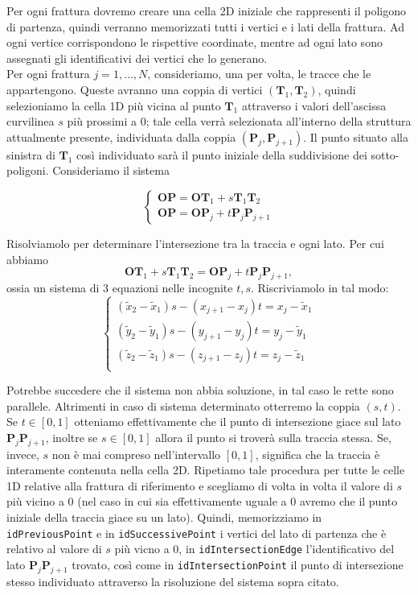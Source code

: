 \documentclass[a4paper]{article}
\newcommand{\B}{\mathbf}
\begin{document}
Per ogni frattura dovremo creare una cella 2D iniziale che rappresenti il poligono di partenza, quindi verranno memorizzati tutti i vertici e i lati della frattura. Ad ogni vertice corrispondono le rispettive coordinate, mentre ad ogni lato sono assegnati gli identificativi dei vertici che lo generano. \\

Per ogni frattura $j=1,\dots,N$, consideriamo, una per volta, le tracce che le appartengono. Queste avranno una coppia di vertici $(\B T_{1},\B T_{2})$, quindi selezioniamo la cella 1D più vicina al punto $\B T_1$ attraverso i valori dell'ascissa curvilinea $s$ più prossimi a $0$; tale cella verrà selezionata all'interno della struttura attualmente presente, individuata dalla coppia $(\B P_{j},\B P_{j+1})$. Il punto situato alla sinistra di $\B T_1$ così individuato sarà il punto iniziale della suddivisione dei sotto-poligoni. Consideriamo il sistema

\begin{equation}
\begin{cases}
\B{OP}=\B{OT}_1+s\B{T}_1\B{T}_{2} \\ 
\B{OP}=\B{OP}_j+t\B{P}_j\B{P}_{j+1}
\end{cases}
\label{eq:intersezioni}
\end{equation}

Risolviamolo per determinare l'intersezione tra la traccia e ogni lato. Per cui abbiamo $$\B{OT}_{1}+s\B{T}_{1}\B T_{2}=\B{OP}_j+t\B{P}_j\B{P}_{j+1},$$ ossia un sistema di $3$ equazioni nelle incognite $t,s$. Riscriviamolo in tal modo:
\begin{equation} \label{sis:parametri}
\begin{cases}
(\tilde{x}_{2}-\tilde{x}_1)s-(x_{j+1}-x_j)t=x_j-\tilde{x}_1 \\
(\tilde{y}_{2}-\tilde{y}_1)s-(y_{j+1}-y_j)t=y_j-\tilde{y}_1 \\
(\tilde{z}_{2}-\tilde{z}_1)s-(z_{j+1}-z_j)t=z_j-\tilde{z}_1 \\
\end{cases}
\end{equation}

Potrebbe succedere che il sistema non abbia soluzione, in tal caso le rette sono parallele. Altrimenti in caso di sistema determinato otterremo la coppia $( s,t )$. Se $t \in [0,1]$ otteniamo effettivamente che il punto di intersezione giace sul lato $\B{P}_{j}\B{P}_{j+1}$, inoltre se $s \in [0,1]$ allora il punto si troverà sulla traccia stessa. Se, invece, $s$ non è mai compreso nell'intervallo $[0,1]$, significa che la traccia è interamente contenuta nella cella 2D. Ripetiamo tale procedura per tutte le celle 1D relative alla frattura di riferimento e scegliamo di volta in volta il valore di $s$ più vicino a 0 (nel caso in cui sia effettivamente uguale a $0$ avremo che il punto iniziale della traccia giace su un lato).
Quindi, memorizziamo in \texttt{idPreviousPoint} e in \texttt{idSuccessivePoint} i vertici del lato di partenza che è relativo al valore di $s$ più vicno a $0$, in \texttt{idIntersectionEdge} l'identificativo del lato $\B{P}_{j}\B{P}_{j+1}$ trovato, così come in \texttt{idIntersectionPoint} il punto di intersezione stesso individuato attraverso la risoluzione del sistema sopra citato. 
\end{document}
